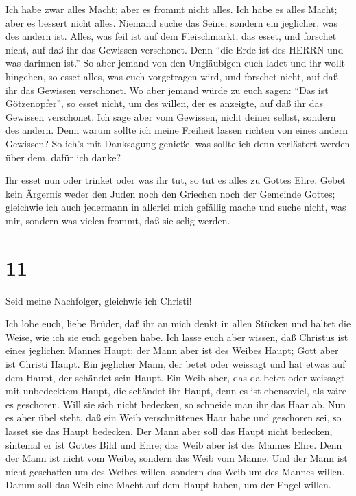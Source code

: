  Ich habe zwar alles Macht; aber es frommt nicht alles. Ich
habe es alles Macht; aber es bessert nicht alles.  Niemand
suche das Seine, sondern ein jeglicher, was des andern ist.
 Alles, was feil ist auf dem Fleischmarkt, das esset, und
forschet nicht, auf daß ihr das Gewissen verschonet.  Denn
``die Erde ist des HERRN und was darinnen ist.''  So aber
jemand von den Ungläubigen euch ladet und ihr wollt hingehen, so esset
alles, was euch vorgetragen wird, und forschet nicht, auf daß ihr das
Gewissen verschonet.  Wo aber jemand würde zu euch sagen:
``Das ist Götzenopfer'', so esset nicht, um des willen, der es anzeigte,
auf daß ihr das Gewissen verschonet.  Ich sage aber vom
Gewissen, nicht deiner selbst, sondern des andern. Denn warum sollte ich
meine Freiheit lassen richten von eines andern Gewissen? 
So ich's mit Danksagung genieße, was sollte ich denn verlästert werden
über dem, dafür ich danke?

 Ihr esset nun oder trinket oder was ihr tut, so tut es
alles zu Gottes Ehre.  Gebet kein Ärgernis weder den Juden
noch den Griechen noch der Gemeinde Gottes;  gleichwie ich
auch jedermann in allerlei mich gefällig mache und suche nicht, was mir,
sondern was vielen frommt, daß sie selig werden.

\hypertarget{section-10}{%
\section{11}\label{section-10}}

 Seid meine Nachfolger, gleichwie ich Christi!

 Ich lobe euch, liebe Brüder, daß ihr an mich denkt in allen
Stücken und haltet die Weise, wie ich sie euch gegeben habe.
 Ich lasse euch aber wissen, daß Christus ist eines
jeglichen Mannes Haupt; der Mann aber ist des Weibes Haupt; Gott aber
ist Christi Haupt.  Ein jeglicher Mann, der betet oder
weissagt und hat etwas auf dem Haupt, der schändet sein Haupt.
 Ein Weib aber, das da betet oder weissagt mit unbedecktem
Haupt, die schändet ihr Haupt, denn es ist ebensoviel, als wäre es
geschoren.  Will sie sich nicht bedecken, so schneide man
ihr das Haar ab. Nun es aber übel steht, daß ein Weib verschnittenes
Haar habe und geschoren sei, so lasset sie das Haupt bedecken.
 Der Mann aber soll das Haupt nicht bedecken, sintemal er
ist Gottes Bild und Ehre; das Weib aber ist des Mannes Ehre.
 Denn der Mann ist nicht vom Weibe, sondern das Weib vom
Manne.  Und der Mann ist nicht geschaffen um des Weibes
willen, sondern das Weib um des Mannes willen.  Darum soll
das Weib eine Macht auf dem Haupt haben, um der Engel willen.

